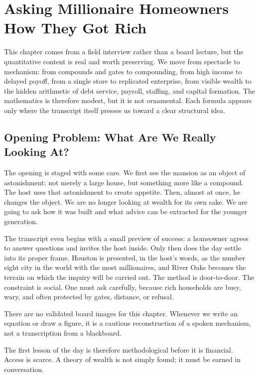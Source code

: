 \chapter{Asking Millionaire Homeowners How They Got Rich}

This chapter comes from a field interview rather than a board lecture, but the quantitative content is real and worth preserving. We move from spectacle to mechanism: from compounds and gates to compounding, from high income to delayed payoff, from a single store to replicated enterprise, from visible wealth to the hidden arithmetic of debt service, payroll, staffing, and capital formation. The mathematics is therefore modest, but it is not ornamental. Each formula appears only where the transcript itself presses us toward a clear structural idea.

\section{Opening Problem: What Are We Really Looking At?}

The opening is staged with some care. We first see the mansion as an object of astonishment: not merely a large house, but something more like a compound. The host uses that astonishment to create appetite. Then, almost at once, he changes the object. We are no longer looking at wealth for its own sake. We are going to ask how it was built and what advice can be extracted for the younger generation.

The transcript even begins with a small preview of success: a homeowner agrees to answer questions and invites the host inside. Only then does the day settle into its proper frame. Houston is presented, in the host's words, as the number eight city in the world with the most millionaires, and River Oaks becomes the terrain on which the inquiry will be carried out. The method is door-to-door. The constraint is social. One must ask carefully, because rich households are busy, wary, and often protected by gates, distance, or refusal.

\begin{remark}
There are no validated board images for this chapter. Whenever we write an equation or draw a figure, it is a cautious reconstruction of a spoken mechanism, not a transcription from a blackboard.
\end{remark}

The first lesson of the day is therefore methodological before it is financial. Access is scarce. A theory of wealth is not simply found; it must be earned in conversation.

